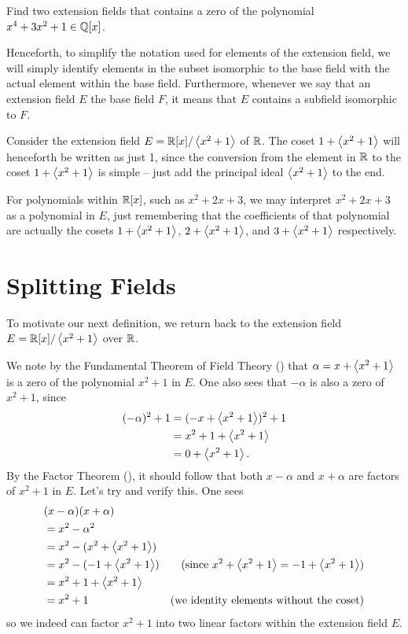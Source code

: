 \begin{exercise}
    Find two extension fields that contains a zero of the polynomial $x^4 + 3x^2 + 1 \in \mathbb{Q}[x]$.
\end{exercise}

Henceforth, to simplify the notation used for elements of the extension field, we will simply identify elements in the subset isomorphic to the base field with the actual element within the base field. Furthermore, whenever we say that an extension field $E$  the base field $F$, it means that $E$ contains a subfield isomorphic to $F$.

\begin{example}
    Consider the extension field $E = \mathbb{R}[x]/\left\langle x^2+1\right\rangle$ of $\mathbb{R}$. The coset $1 + \left\langle x^2+1\right\rangle$ will henceforth be written as just 1, since the conversion from the element in $\mathbb{R}$ to the coset $1 + \left\langle x^2+1\right\rangle$ is simple -- just add the principal ideal $\left\langle x^2+1\right\rangle$ to the end.

    For polynomials within $\mathbb{R}[x]$, such as $x^2 + 2x + 3$, we may interpret $x^2 + 2x + 3$ as a polynomial in $E$, just remembering that the coefficients of that polynomial are actually the cosets $1 + \left\langle x^2+1\right\rangle$, $2 + \left\langle x^2+1\right\rangle$, and $3 + \left\langle x^2+1\right\rangle$ respectively.
\end{example}

\section{Splitting Fields}
To motivate our next definition, we return back to the extension field $E = \mathbb{R}[x]/\left\langle x^2+1\right\rangle$ over $\mathbb{R}$.
\begin{example}
    We note by the Fundamental Theorem of Field Theory () that $\alpha = x + \left\langle x^2+1\right\rangle$ is a zero of the polynomial $x^2+1$ in $E$. One also sees that $-\alpha$ is also a zero of $x^2+1$, since
    \begin{align*}
        (-\alpha)^2 + 1 &= (-x + \left\langle x^2+1\right\rangle)^2 + 1\\
        &= x^2 + 1 + \left\langle x^2+1\right\rangle\\
        &= 0 + \left\langle x^2+1\right\rangle.
    \end{align*}
    By the Factor Theorem (), it should follow that both $x - \alpha$ and $x + \alpha$ are factors of $x^2 + 1$ in $E$. Let's try and verify this. One sees
    \begin{align*}
        &(x-\alpha)(x+\alpha)\\
        &= x^2 - \alpha^2\\
        &= x^2 - (x^2 + \left\langle x^2+1\right\rangle)\\
        &= x^2 - (-1 + \left\langle x^2+1\right\rangle) & (\text{since } x^2 + \left\langle x^2+1\right\rangle = -1 + \left\langle x^2+1\right\rangle)\\
        &= x^2 + 1 + \left\langle x^2+1\right\rangle\\
        &= x^2 + 1 & (\text{we identity elements without the coset})
    \end{align*}
    so we indeed can factor $x^2 + 1$ into two linear factors within the extension field $E$.
\end{example}

